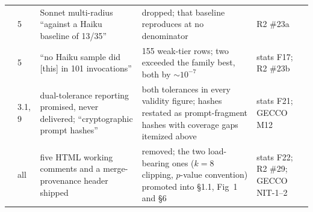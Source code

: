 \documentclass[11pt]{article}
\begin{document}
\begin{longtable}{L{4mm}L{10mm}L{41mm}L{64mm}L{18mm}}
 & 5 & Sonnet multi-radius ``against a Haiku baseline of 13/35'' & dropped; that baseline reproduces at no denominator & R2 \#23a \\
 & 5 & ``no Haiku sample did [this] in 101 invocations'' & 155 weak-tier rows; two exceeded the family best, both by ${\sim}10^{-7}$ & stats F17; R2 \#23b \\
 & 3.1, 9 & dual-tolerance reporting promised, never delivered; ``cryptographic prompt hashes'' & both tolerances in every validity figure; hashes restated as prompt-fragment hashes with coverage gaps itemized above & stats F21; GECCO M12 \\
 & all & five HTML working comments and a merge-provenance header shipped & removed; the two load-bearing ones ($k = 8$ clipping, $p$-value convention) promoted into \S1.1, Fig~1 and \S6 & stats F22; R2 \#29; GECCO NIT-1--2 \\
\end{longtable}
\endgroup
\end{document}
